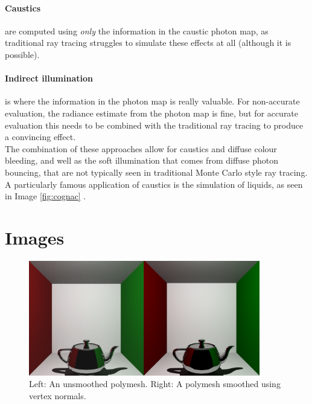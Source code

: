 \documentclass[a4paper]{article}
\begin{document}
\paragraph{Caustics} are computed using \textit{only} the information in the caustic photon map, as traditional ray tracing struggles to simulate these effects at all (although it is possible).

\paragraph{Indirect illumination} is where the information in the photon map is really valuable. For non-accurate evaluation, the radiance estimate from the photon map is fine, but for accurate evaluation this needs to be combined with the traditional ray tracing to produce a convincing effect.\\

The combination of these approaches allow for caustics and diffuse colour bleeding, and well as the soft illumination that comes from diffuse photon bouncing, that are not typically seen in traditional Monte Carlo style ray tracing. A particularly famous application of caustics is the simulation of liquids, as seen in Image \ref{fig:cognac} \cite{Jensen1996photonmaps}.

\pagebreak
\printbibliography
\pagebreak
\appendix
\section{Images}

\begin{figure}[h]
    \centering
    \includegraphics[width = 0.9\textwidth]{images/pmsmoothing.png}
    \caption{Left: An unsmoothed polymesh. Right: A polymesh smoothed using vertex normals.}\label{fig:smoothing}
\end{figure}
\end{document}

